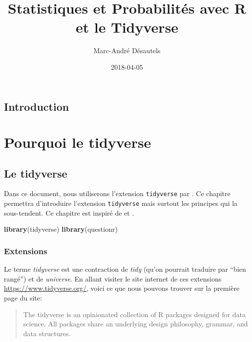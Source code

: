 \documentclass[]{book}
\title{Statistiques et Probabilités avec R et le Tidyverse}
\author{Marc-André Désautels}
\date{2018-04-05}
\newenvironment{Shaded}{\begin{snugshade}}{\end{snugshade}}
\newcommand{\KeywordTok}[1]{\textcolor[rgb]{0.13,0.29,0.53}{\textbf{#1}}}
\newcommand{\NormalTok}[1]{#1}
\theoremstyle{definition}
\theoremstyle{definition}
\theoremstyle{definition}
\theoremstyle{remark}
\begin{document}
\maketitle

{
\setcounter{tocdepth}{1}
\tableofcontents
}
\hypertarget{introduction}{%
\chapter*{Introduction}\label{introduction}}

\hypertarget{part-pourquoi-le-tidyverse}{%
\part{Pourquoi le
tidyverse}\label{part-pourquoi-le-tidyverse}}

\hypertarget{tidyverse}{%
\chapter{Le tidyverse}\label{tidyverse}}

Dans ce document, nous utiliserons l'extension \texttt{tidyverse} par
\citep{R-tidyverse}. Ce chapitre permettra d'introduire l'extension
\texttt{tidyverse} mais surtout les principes qui la sous-tendent. Ce
chapitre est inspiré de \citep{juba2018} et \citep{wickham2017}.

\begin{Shaded}
\begin{Highlighting}[]
\KeywordTok{library}\NormalTok{(tidyverse)}
\KeywordTok{library}\NormalTok{(questionr)}
\end{Highlighting}
\end{Shaded}

\hypertarget{extensions}{%
\section{Extensions}\label{extensions}}

Le terme \emph{tidyverse} est une contraction de \emph{tidy} (qu'on
pourrait traduire par ``bien rangé'') et de \emph{universe}. En allant
visiter le site internet de ces extensions
\url{https://www.tidyverse.org/}, voici ce que nous pouvons trouver sur
la première page du site:

\begin{quote}
The tidyverse is an opinionated collection of R packages designed for
data science. All packages share an underlying design philosophy,
grammar, and data structures.
\end{quote}
\end{document}
